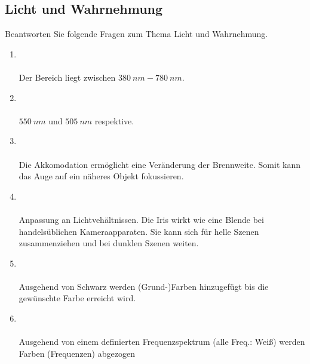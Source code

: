 \subsection{Licht und Wahrnehmung}
Beantworten Sie folgende Fragen zum Thema Licht und Wahrnehmung.
\begin{enumerate}
    \item   {}\\\\
            Der Bereich liegt zwischen $\SI{380}{nm}-\SI{780}{nm}$.

    \item   {}\\\\
            $\SI{550}{nm}$ und $\SI{505}{nm}$ respektive.

    \item   {}\\\\
            Die Akkomodation ermöglicht eine Veränderung der Brennweite. Somit kann das Auge auf ein
            näheres Objekt fokussieren.

    \item   {}\\\\
            Anpassung an Lichtvehältnissen. Die Iris wirkt wie eine Blende bei handelsüblichen Kameraapparaten. Sie kann sich für helle Szenen 
            zusammenziehen und bei dunklen Szenen weiten.

    \item   {}\\\\
            Ausgehend von Schwarz werden (Grund-)Farben hinzugefügt bis die gewünschte Farbe erreicht wird.
    \item   {}\\\\
            Ausgehend von einem definierten Frequenzspektrum (alle Freq.: Weiß) werden Farben (Frequenzen) abgezogen 


\end{enumerate}
